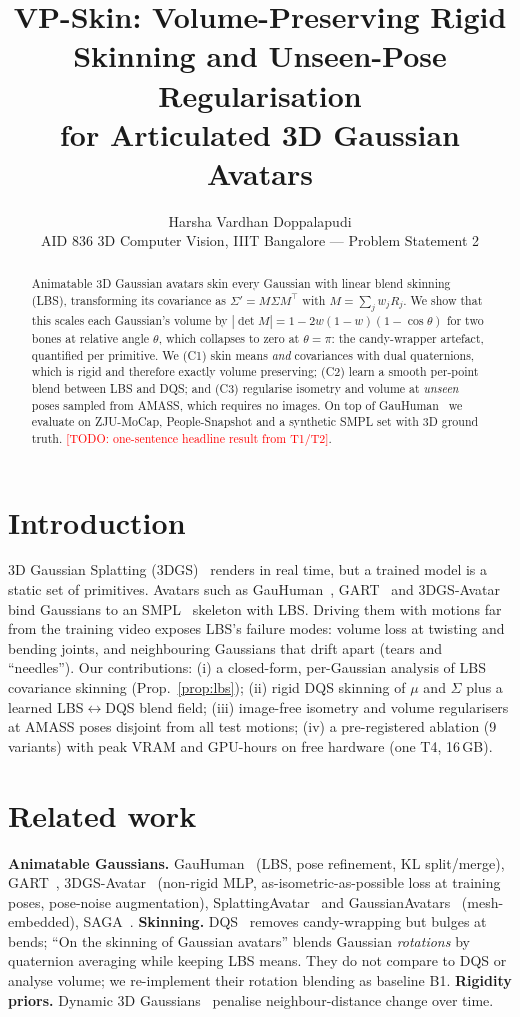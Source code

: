 \documentclass[10pt,twocolumn]{article}
\title{VP-Skin: Volume-Preserving Rigid Skinning and Unseen-Pose Regularisation\\for Articulated 3D Gaussian Avatars}
\author{Harsha Vardhan Doppalapudi \TODO{teammate}\\ AID 836 3D Computer Vision, IIIT Bangalore --- Problem Statement 2}
\date{}
\newcommand{\TODO}[1]{\textcolor{red}{[TODO: #1]}}
\begin{document}
\maketitle

\begin{abstract}
Animatable 3D Gaussian avatars skin every Gaussian with linear blend skinning (LBS), transforming its covariance as
$\Sigma'=M\Sigma M^\top$ with $M=\sum_j w_jR_j$. We show that this scales each Gaussian's volume by
$|\det M| = 1-2w(1-w)(1-\cos\theta)$ for two bones at relative angle $\theta$, which collapses to zero at $\theta=\pi$:
the candy-wrapper artefact, quantified per primitive. We (C1) skin means \emph{and} covariances with dual quaternions,
which is rigid and therefore exactly volume preserving; (C2) learn a smooth per-point blend between LBS and DQS; and
(C3) regularise isometry and volume at \emph{unseen} poses sampled from AMASS, which requires no images. On top of
GauHuman~\cite{gauhuman} we evaluate on ZJU-MoCap, People-Snapshot and a synthetic SMPL set with 3D ground truth.
\TODO{one-sentence headline result from T1/T2}.
\end{abstract}

\section{Introduction}
3D Gaussian Splatting (3DGS)~\cite{3dgs} renders in real time, but a trained model is a static set of primitives.
Avatars such as GauHuman~\cite{gauhuman}, GART~\cite{gart} and 3DGS-Avatar~\cite{3dgsavatar} bind Gaussians to an
SMPL~\cite{smpl} skeleton with LBS. Driving them with motions far from the training video exposes LBS's failure modes:
volume loss at twisting and bending joints, and neighbouring Gaussians that drift apart (tears and ``needles'').
Our contributions:
(i) a closed-form, per-Gaussian analysis of LBS covariance skinning (Prop.~\ref{prop:lbs});
(ii) rigid DQS skinning of $\mu$ and $\Sigma$ plus a learned LBS$\leftrightarrow$DQS blend field;
(iii) image-free isometry and volume regularisers at AMASS poses disjoint from all test motions;
(iv) a pre-registered ablation (9 variants) with peak VRAM and GPU-hours on free hardware (one T4, 16\,GB).

\section{Related work}
\textbf{Animatable Gaussians.} GauHuman~\cite{gauhuman} (LBS, pose refinement, KL split/merge), GART~\cite{gart},
3DGS-Avatar~\cite{3dgsavatar} (non-rigid MLP, as-isometric-as-possible loss at training poses, pose-noise augmentation),
SplattingAvatar~\cite{splattingavatar} and GaussianAvatars~\cite{gaussianavatars} (mesh-embedded), SAGA~\cite{saga}.
\textbf{Skinning.} DQS~\cite{dqs} removes candy-wrapping but bulges at bends; ``On the skinning of Gaussian avatars''
\cite{skinning_gs} blends Gaussian \emph{rotations} by quaternion averaging while keeping LBS means. They do not compare
to DQS or analyse volume; we re-implement their rotation blending as baseline B1.
\textbf{Rigidity priors.} Dynamic 3D Gaussians~\cite{dyn3dgs} penalise neighbour-distance change over time.
\end{document}
